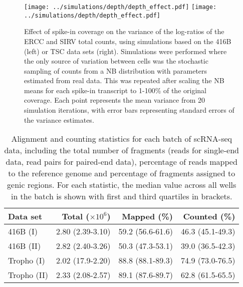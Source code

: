 \documentclass{article}
\begin{document}
\begin{figure}[btp]
    \begin{center}
        \texttt{[image: ../simulations/depth/depth\_effect.pdf]}
        \texttt{[image: ../simulations/depth/depth\_effect.pdf]}
    \end{center}
    \caption{Effect of spike-in coverage on the variance of the log-ratios of the ERCC and SIRV total counts, using simulations based on the 416B (left) or TSC data sets (right).
        Simulations were performed where the only source of variation between cells was the stochastic sampling of counts from a NB distribution with parameters estimated from real data.
        This was repeated after scaling the NB means for each spike-in transcript to 1-100\% of the original coverage. 
        Each point represents the mean variance from 20 simulation iterations, with error bars representing standard errors of the variance estimates.
    }
    \label{fig:sampledepth}
\end{figure}

\begin{table}[btp]
    \caption{Alignment and counting statistics for each batch of scRNA-seq data, including the total number of fragments (reads for single-end data, read pairs for paired-end data), percentage of reads mapped to the reference genome and percentage of fragments assigned to genic regions.
    For each statistic, the median value across all wells in the batch is shown with first and third quartiles in brackets.}
    \begin{center}
        \begin{tabular}{l r r r}
            \hline
            \textbf{Data set} & \textbf{Total ($\times 10^6$)} & \textbf{Mapped (\%)} & \textbf{Counted (\%)} \\
            \hline
            416B (I)  & 2.80 (2.39-3.10) & 59.2 (56.6-61.6) & 46.3 (45.1-49.3) \\
            416B (II) & 2.82 (2.40-3.26) & 50.3 (47.3-53.1) & 39.0 (36.5-42.3) \\
            Tropho (I) & 2.02 (17.9-2.20) & 88.8 (88.1-89.3) & 74.9 (73.0-76.5) \\
            Tropho (II) & 2.33 (2.08-2.57) & 89.1 (87.6-89.7) & 62.8 (61.5-65.5) \\
            \hline
        \end{tabular}
    \end{center}
\end{table}
\end{document}

